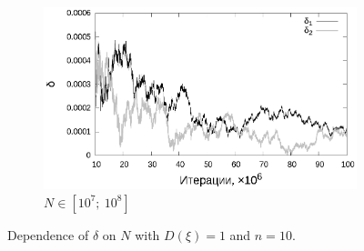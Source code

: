 \documentclass[11pt,a4paper]{article}
\theoremstyle{definition}
\begin{document}
\begin{figure}[h!]
\begin{subfigure}[b]{0.3\textwidth}
    \includegraphics[width=\textwidth]{figs/classic/linear_log_1x_2_samples_10_variance_1_norm.log_end.eps}
    \caption{$N \in [10^7;~10^8]$}
    \label{fig:classic_var1_n10_end}
  \end{subfigure}
  \caption{Dependence of $\delta$ on $N$ with $D(\xi) = 1$ and $n = 10$.}
  \label{fig:classic_var1_n10}
\end{figure}
\end{document}
